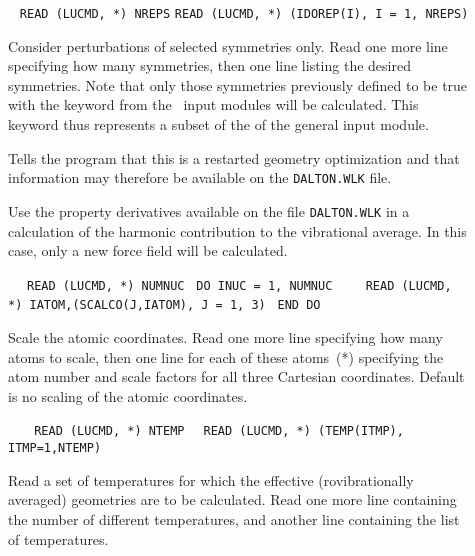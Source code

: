 \begin{description}
\item[]\verb| |\newline
\verb|READ (LUCMD, *) NREPS|\newline
\verb|READ (LUCMD, *) (IDOREP(I), I = 1, NREPS)|

Consider perturbations of selected
symmetries only.  Read one more line specifying how many
symmetries, then one line listing the desired symmetries. Note that
only those symmetries previously defined to be true with the keyword
 from the \aba\ input modules will be calculated. This
keyword thus represents a subset of the  of the general
input module.

\item[] Tells the program that this is a restarted
geometry optimization and that
information may therefore be available
on the \verb|DALTON.WLK| file.

\item[] Use the property derivatives available on the file 
\verb|DALTON.WLK| in a calculation of the harmonic contribution to the
vibrational average. In this case, only a new force field will be calculated.

\item[]\verb| |\newline
\verb| READ (LUCMD, *) NUMNUC|\newline
\verb| DO INUC = 1, NUMNUC|\newline
\verb|    READ (LUCMD, *) IATOM,(SCALCO(J,IATOM), J = 1, 3)|\newline
\verb| END DO|

Scale the atomic coordinates.  Read one more
line specifying how many atoms to scale, then one line for
each of these atoms~(*) specifying the atom number and scale
factors for all three Cartesian coordinates. Default is no scaling of
the atomic coordinates.


\item[]\verb| |\newline
\verb|  READ (LUCMD, *) NTEMP|\newline
\verb|  READ (LUCMD, *) (TEMP(ITMP), ITMP=1,NTEMP)|

Read a set of temperatures for which the
effective (rovibrationally averaged) geometries are to be
calculated. Read one more line containing the number of different
temperatures, and another line containing the list of temperatures.


\end{description}

